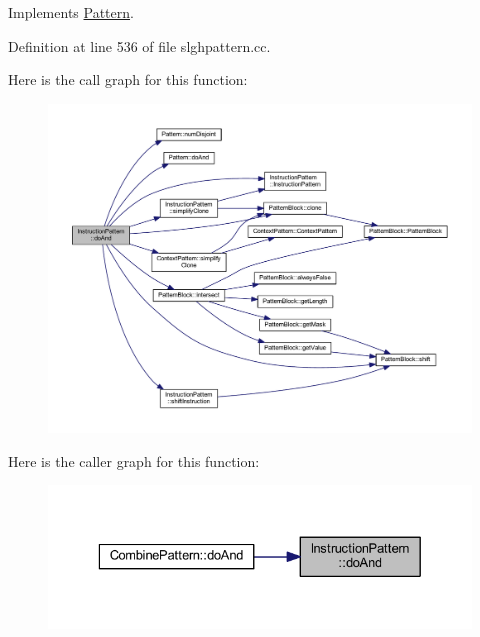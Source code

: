 Implements \mbox{\hyperlink{class_pattern_a960f3e000e2642c452fe11f5b55a9589}{Pattern}}.



Definition at line 536 of file slghpattern.\+cc.

Here is the call graph for this function\+:
\nopagebreak
\begin{figure}[H]
\begin{center}
\leavevmode
\includegraphics[width=350pt]{class_instruction_pattern_ac56875a4e5fca7c5a3ea2a92a3afc47b_cgraph}
\end{center}
\end{figure}
Here is the caller graph for this function\+:
\nopagebreak
\begin{figure}[H]
\begin{center}
\leavevmode
\includegraphics[width=329pt]{class_instruction_pattern_ac56875a4e5fca7c5a3ea2a92a3afc47b_icgraph}
\end{center}
\end{figure}
\mbox{\label{class_instruction_pattern_ae44ac91ca0f01f366cdd5e89d7fe0d06}} 
